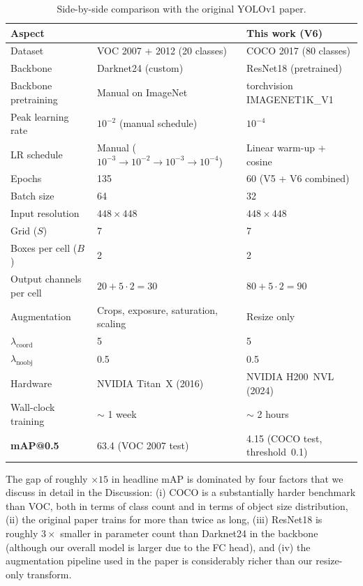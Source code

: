 \begin{table}[!ht]
\centering
\caption{Side-by-side comparison with the original YOLOv1 paper.}
\label{tab:vs-paper}
\small
\begin{tabular}{lll}
\toprule
\textbf{Aspect} & \textbf{\citet{redmon2016you}} & \textbf{This work (V6)} \\
\midrule
Dataset                & VOC 2007 + 2012 (20 classes)   & COCO 2017 (80 classes) \\
Backbone               & Darknet24 (custom)             & ResNet18 (pretrained) \\
Backbone pretraining   & Manual on ImageNet             & torchvision IMAGENET1K\_V1 \\
Peak learning rate     & $10^{-2}$ (manual schedule)    & $10^{-4}$ \\
LR schedule            & Manual ($10^{-3}\!\to\!10^{-2}\!\to\!10^{-3}\!\to\!10^{-4}$) & Linear warm-up + cosine \\
Epochs                 & 135                             & 60 (V5 + V6 combined) \\
Batch size             & 64                              & 32 \\
Input resolution       & $448\times 448$                 & $448\times 448$ \\
Grid ($S$)             & 7                               & 7 \\
Boxes per cell ($B$)   & 2                               & 2 \\
Output channels per cell & $20 + 5\cdot 2 = 30$         & $80 + 5\cdot 2 = 90$ \\
Augmentation           & Crops, exposure, saturation, scaling & Resize only \\
$\lambda_{\text{coord}}$ & 5                            & 5 \\
$\lambda_{\text{noobj}}$ & 0.5                          & 0.5 \\
Hardware               & NVIDIA Titan~X (2016)          & NVIDIA H200~NVL (2024) \\
Wall-clock training    & $\sim$ 1 week                  & $\sim$ 2 hours \\
\midrule
\textbf{mAP@0.5}       & 63.4 (VOC 2007 test)            & 4.15 (COCO test, threshold~0.1) \\
\bottomrule
\end{tabular}
\end{table}

\noindent The gap of roughly $\times 15$ in headline mAP is dominated by four
factors that we discuss in detail in the Discussion: (i) COCO is a
substantially harder benchmark than VOC, both in terms of class count and in
terms of object size distribution, (ii) the original paper trains for more
than twice as long, (iii) ResNet18 is roughly $3\times$ smaller in parameter
count than Darknet24 in the backbone (although our overall model is larger
due to the FC head), and (iv) the augmentation pipeline used in the paper is
considerably richer than our resize-only transform.

